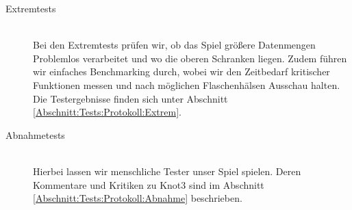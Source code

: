 \begin{description}
\clearpage
	
	
	\item[Extremtests] \hfill
	\\
	
	Bei den Extremtests prüfen wir, ob das Spiel  größere Datenmengen Problemlos verarbeitet und wo die oberen Schranken liegen. Zudem führen wir einfaches Benchmarking durch, wobei wir den Zeitbedarf kritischer Funktionen messen und nach möglichen Flaschenhälsen Ausschau halten. Die Testergebnisse finden sich unter Abschnitt \ref{Abschnitt:Tests:Protokoll:Extrem}.\\


	\item[Abnahmetests] \hfill
	\\
	
	Hierbei lassen wir menschliche Tester unser Spiel spielen. Deren Kommentare und Kritiken zu Knot3 sind im Abschnitt \ref{Abschnitt:Tests:Protokoll:Abnahme} beschrieben.\\
		
\end{description}







